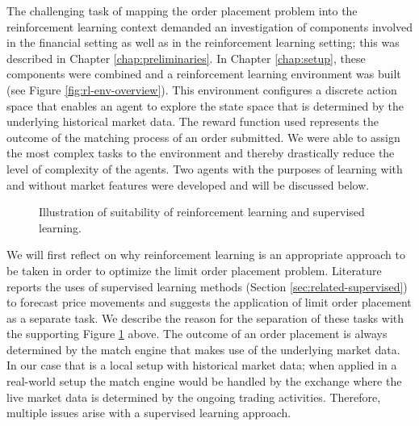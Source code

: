     The challenging task of mapping the order placement problem into the reinforcement learning context demanded an investigation of components involved in the financial setting as well as in the reinforcement learning setting; this was described in Chapter \ref{chap:preliminaries}.
    In Chapter \ref{chap:setup}, these components were combined and a reinforcement learning environment was built (see Figure \ref{fig:rl-env-overview}).
    This environment configures a discrete action space that enables an agent to explore the state space that is determined by the underlying historical market data.
    The reward function used represents the outcome of the matching process of an order submitted.
    We were able to assign the most complex tasks to the environment and thereby drastically reduce the level of complexity of the agents.
    Two agents with the purposes of learning with and without market features were developed and will be discussed below.
    \begin{figure}[H]
    \centering
    \caption{Illustration of suitability of reinforcement learning and supervised learning.}
    \label{fig:discuss-rl-sv}
    \end{figure}
    We will first reflect on why reinforcement learning is an appropriate approach to be taken in order to optimize the limit order placement problem.
    Literature reports the uses of supervised learning methods (Section \ref{sec:related-supervised}) to forecast price movements and suggests the application of limit order placement as a separate task.
    We describe the reason for the separation of these tasks with the supporting Figure \ref{fig:discuss-rl-sv} above.
    The outcome of an order placement is always determined by the match engine that makes use of the underlying market data.
    In our case that is a local setup with historical market data; when applied in a real-world setup the match engine would be handled by the exchange where the live market data is determined by the ongoing trading activities.
    Therefore, multiple issues arise with a supervised learning approach.
